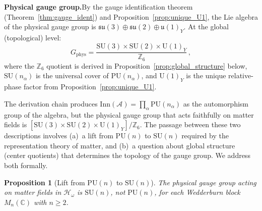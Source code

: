 \documentclass[11pt,a4paper]{article}
\newtheorem{proposition}[theorem]{Proposition}
\theoremstyle{definition}
\newcommand{\SU}{\mathrm{SU}}
\newcommand{\U}{\mathrm{U}}
\begin{document}
\noindent\textbf{Physical gauge group.}\quad By the gauge identification
theorem (Theorem~\ref{thm:gauge_ident}) and
Proposition~\ref{prop:unique_U1}, the Lie algebra of the physical gauge
group is $\mathfrak{su}(3) \oplus \mathfrak{su}(2) \oplus
\mathfrak{u}(1)_Y$.  At the global (topological) level:
\[
  G_{\mathrm{phys}} = \frac{\SU(3) \times \SU(2) \times \U(1)_Y}
  {\mathbb{Z}_6}\,,
\]
where the $\mathbb{Z}_6$ quotient is derived in
Proposition~\ref{prop:global_structure} below, $\SU(n_\alpha)$ is the
universal cover of $\mathrm{PU}(n_\alpha)$, and $\U(1)_Y$ is the
unique relative-phase factor from Proposition~\ref{prop:unique_U1}.

The derivation chain produces $\mathrm{Inn}(\mathcal{A}) = \prod_\alpha
\mathrm{PU}(n_\alpha)$ as the automorphism group of the algebra, but the
physical gauge group that acts faithfully on matter fields is
$[\SU(3) \times \SU(2) \times \U(1)_Y] / \mathbb{Z}_6$.  The passage between these two descriptions involves
(a)~a lift from $\mathrm{PU}(n)$ to $\SU(n)$ required by the
representation theory of matter, and (b)~a question about global
structure (center quotients) that determines the topology of the gauge
group.  We address both formally.

\begin{proposition}[Lift from $\mathrm{PU}(n)$ to $\SU(n)$]%
\label{prop:PU_to_SU}
The physical gauge group acting on matter fields in $\mathcal{H}_\omega$
is $\SU(n)$, not $\mathrm{PU}(n)$, for each Wedderburn block
$M_n(\mathbb{C})$ with $n \ge 2$.
\end{proposition}
\end{document}
